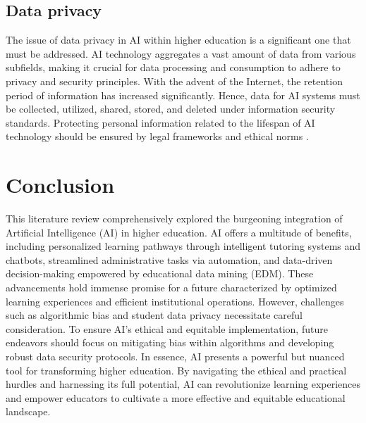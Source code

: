 \subsection{Data privacy}
The issue of data privacy in AI within higher education is a significant one that must be addressed.
AI technology aggregates a vast amount of data from various subfields, making it crucial for data
processing and consumption to adhere to privacy and security principles. With the advent of the Internet,
the retention period of information has increased significantly. Hence, data for AI systems must be collected,
utilized, shared, stored, and deleted under information security standards. Protecting personal information
related to the lifespan of AI technology should be ensured by legal frameworks and ethical norms \citep{unesco_2022}.

\section{Conclusion}
This literature review comprehensively explored the burgeoning integration of Artificial Intelligence (AI) in higher education.
AI offers a multitude of benefits, including personalized learning pathways through intelligent tutoring systems and chatbots,
streamlined administrative tasks via automation, and data-driven decision-making empowered by educational data mining (EDM).
These advancements hold immense promise for a future characterized by optimized learning experiences and efficient institutional
operations. However, challenges such as algorithmic bias and student data privacy necessitate careful consideration.
To ensure AI's ethical and equitable implementation, future endeavors should focus on mitigating bias within algorithms and developing
robust data security protocols. In essence, AI presents a powerful but nuanced tool for transforming higher education.
By navigating the ethical and practical hurdles and harnessing its full potential, AI can revolutionize learning experiences
and empower educators to cultivate a more effective and equitable educational landscape.
